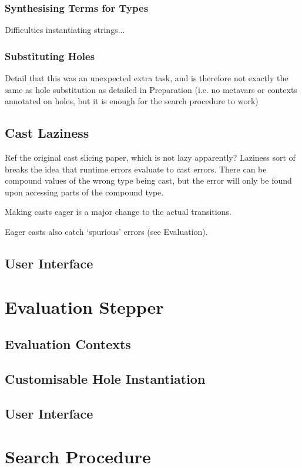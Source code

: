 \subsubsection{Synthesising Terms for Types}
Difficulties instantiating strings...

\subsubsection{Substituting Holes}\label{sec:HoleSubstitutionImplementation}
Detail that this was an unexpected extra task, and is therefore not exactly the same as hole substitution as detailed in Preparation (i.e. no metavars or contexts annotated on holes, but it is enough for the search procedure to work)

\subsection{Cast Laziness}\label{sec:CastLaziness}
Ref the original cast slicing paper, which is not lazy apparently? Laziness sort of breaks the idea that runtime errors evaluate to cast errors. There can be compound values of the wrong type being cast, but the error will only be found upon accessing parts of the compound type.

Making casts eager is a major change to the actual transitions.

Eager casts also catch `spurious' errors (see Evaluation).


\subsection{User Interface}

\section{Evaluation Stepper}\label{sec:Stepper}
\subsection{Evaluation Contexts}
\subsection{Customisable Hole Instantiation}
\subsection{User Interface}


\section{Search Procedure}\label{sec:SearchProcedure}
